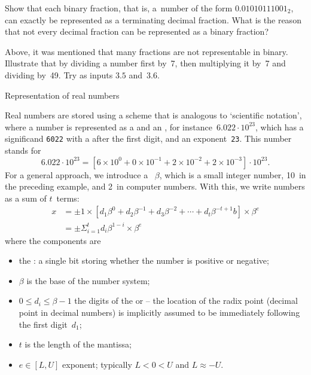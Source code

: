 \begin{exercise}
  Show that each binary fraction, that is,
  a~number of the form $0.01010111001_2$,
  can exactly be represented as a
  terminating decimal fraction. What is the reason that not every
  decimal fraction can be represented as a binary fraction?
\end{exercise}

\begin{exercise}
  \label{ex:fraction-code}
  Above, it was mentioned that many fractions are not
  representable in binary. Illustrate that by dividing a
  number first by~7, then multiplying it by~7 and dividing
  by~49. Try as inputs $3.5$ and~$3.6$.
\end{exercise}

 {Representation of real numbers}
\label{sec:float-representation}

Real numbers are stored using a scheme that is analogous to
`scientific notation', where a number is represented as a
 and an , for
instance~$6.022\cdot 10^{23}$, which has a significand \lstinline{6022} with a
 after the first digit, and an exponent~\lstinline{23}.
This number stands for
\begin{equation}
  6.022\cdot 10^{23}= \left[
    6\times 10^0+0\times 10^{-1}+2\times10^{-2}+2\times10^{-3}
    \right] \cdot 10^{23}. 
\end{equation}
For a general approach,
we introduce a ~$\beta$, which is
a small integer number, 10~in the preceding example, and 2~in computer
numbers.
With this, we write numbers as a sum of $t$~terms:
\begin{equation}
  \begin{array}{rl}
    x &= \pm 1 \times
    \left[ d_1\beta^0+d_2\beta^{-1}+d_3\beta^{-2}+\cdots+d_t\beta^{-t+1}b\right]
    \times \beta^e \\
    & = \pm \Sigma_{i=1}^t d_i\beta^{1-i}  \times\beta^e
  \end{array}
  \label{eq:floatingpoint-def}
\end{equation}
where the components are
\begin{itemize}
\item the : a single bit storing whether the
  number is positive or negative;
\item $\beta$ is the base of the number system;
\item $0\leq d_i\leq \beta-1$ the digits of the 
  or  -- the location of the radix point
  (decimal point in decimal numbers) is implicitly assumed to be
  immediately following the first digit~$d_1$;
\item $t$ is the length of the mantissa;
\item $e\in [L,U]$ exponent; typically $L<{0}<{U} $ and $L\approx-U$.
\end{itemize}

